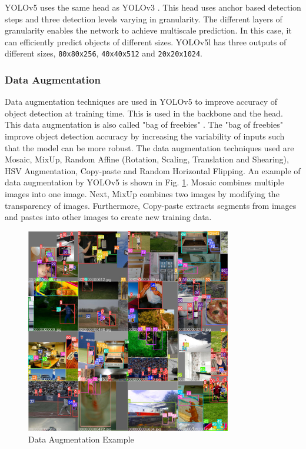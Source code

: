 \documentclass[12pt,a4paper,fleqn]{report}
\begin{document}
YOLOv5 uses the same head as YOLOv3 \cite{yolov3:2018}.
This head uses anchor based detection steps and three detection levels varying in granularity.
The different layers of granularity enables the network to achieve multiscale prediction.
In this case, it can efficiently predict objects of different sizes.
YOLOv5l has three outputs of different sizes, \texttt{80x80x256},
\texttt{40x40x512} and \texttt{20x20x1024}.


\subsubsection{Data Augmentation}
Data augmentation techniques are used in YOLOv5 to improve accuracy of object
detection at training time.
This is used in the backbone and the head.
This data augmentation is also called "bag of freebies" \cite{yolov4:2020}.
The "bag of freebies" improve object detection accuracy by increasing the variability of inputs
such that the model can be more robust.
The data augmentation techniques used are Mosaic, MixUp, Random Affine (Rotation, Scaling,
Translation and Shearing), HSV Augmentation, Copy-paste and Random Horizontal Flipping.
An example of data augmentation by YOLOv5 is shown in Fig. \ref{fig:data_augmentation}.
Mosaic combines multiple images into one image.
Next, MixUp combines two images by modifying the transparency of images.
Furthermore, Copy-paste extracts segments from images and pastes into other images to create new
training data.

\begin{figure}[htbp]
    \begin{center}
        \includegraphics[width=0.8\textwidth]{figures/augmentation_ex.jpg}
    \end{center}
    \caption{Data Augmentation Example}
    \label{fig:data_augmentation}
\end{figure}
\end{document}
